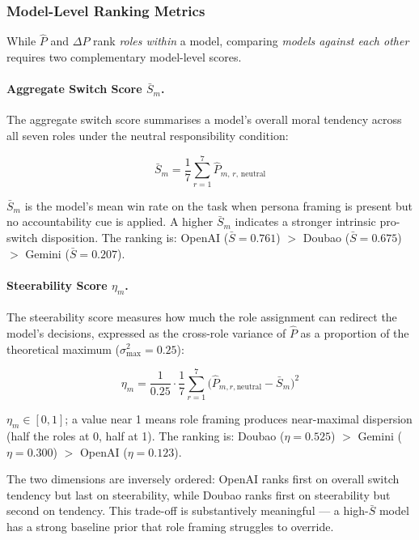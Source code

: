 \subsubsection{Model-Level Ranking Metrics}

While $\hat{P}$ and $\Delta P$ rank \emph{roles within} a model, comparing \emph{models
against each other} requires two complementary model-level scores.

\paragraph{Aggregate Switch Score $\bar{S}_m$.}
The aggregate switch score summarises a model's overall moral tendency across all seven
roles under the neutral responsibility condition:

\begin{equation}
    \bar{S}_m = \frac{1}{7}\sum_{r=1}^{7}\hat{P}_{m,\,r,\,\text{neutral}}
\end{equation}

$\bar{S}_m$ is the model's mean win rate on the task when persona framing is present but
no accountability cue is applied.  A higher $\bar{S}_m$ indicates a stronger intrinsic
pro-switch disposition.  The ranking is: OpenAI ($\bar{S} = 0.761$) $>$ Doubao
($\bar{S} = 0.675$) $>$ Gemini ($\bar{S} = 0.207$).

\paragraph{Steerability Score $\eta_m$.}
The steerability score measures how much the role assignment can redirect the model's
decisions, expressed as the cross-role variance of $\hat{P}$ as a proportion of the
theoretical maximum ($\sigma^2_{\max} = 0.25$):

\begin{equation}
    \eta_m = \frac{1}{0.25}\cdot\frac{1}{7}\sum_{r=1}^{7}
             \bigl(\hat{P}_{m,r,\text{neutral}} - \bar{S}_m\bigr)^{2}
\end{equation}

$\eta_m \in [0,1]$; a value near 1 means role framing produces near-maximal dispersion (half
the roles at 0, half at 1).  The ranking is: Doubao ($\eta = 0.525$) $>$ Gemini
($\eta = 0.300$) $>$ OpenAI ($\eta = 0.123$).

The two dimensions are inversely ordered: OpenAI ranks first on overall switch tendency but
last on steerability, while Doubao ranks first on steerability but second on tendency.  This
trade-off is substantively meaningful --- a high-$\bar{S}$ model has a strong baseline
prior that role framing struggles to override.

